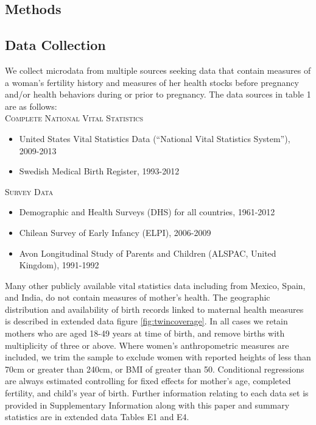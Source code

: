 \documentclass{nature}
\begin{document}
\begin{linenumbers}
\clearpage

\section{Methods}
\subsection{Data Collection}
We collect microdata from multiple sources seeking data that contain measures of a woman's fertility history and measures of her health stocks before pregnancy and/or health behaviors during or prior to pregnancy.  The data sources in table 1 are as follows: \vspace{3mm} \\
\textsc{Complete National Vital Statistics} \vspace{-10mm}
\begin{itemize}
\item United States Vital Statistics Data (``National Vital Statistics System''), 2009-2013 \vspace{-4mm}
\item Swedish Medical Birth Register, 1993-2012 \vspace{-8mm}
\end{itemize}
\textsc{Survey Data} \vspace{-10mm}
\begin{itemize}
\item Demographic and Health Surveys (DHS) for all countries, 1961-2012 \vspace{-4mm}
\item Chilean Survey of Early Infancy (ELPI), 2006-2009 \vspace{-4mm}
\item Avon Longitudinal Study of Parents and Children (ALSPAC, United Kingdom), 1991-1992 \vspace{-4mm}
\end{itemize}
Many other publicly available vital statistics data including from Mexico, Spain, and India, do not contain  measures of mother's health.  The geographic distribution and availability of birth records linked to maternal health measures is described in extended data figure \ref{fig:twincoverage}. In all cases we retain mothers who are aged 18-49 years at time of birth, and remove births with multiplicity of three or above.  Where women's anthropometric measures are included, we trim the sample to exclude women with reported heights of less than 70cm or greater than 240cm, or BMI of greater than 50.  Conditional regressions are always estimated controlling for fixed effects for mother's age, completed fertility, and child's year of birth. Further information relating to each data set is provided in Supplementary Information along with this paper and summary statistics are in extended data Tables E1 and E4.


\end{linenumbers}
\end{document}
